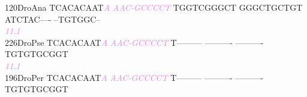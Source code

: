 \documentclass[11pt,twoside,reqno,a4paper]{article}
\begin{document}
{120\hspace*{1\charwidth}DroAna	TCACACAAT\textit{\textcolor{violet}{A}}	\textit{\textcolor{violet}{A}}\textit{\textcolor{violet}{A}}\textit{\textcolor{violet}{C}}\textit{\textcolor{violet}{-}}\textit{\textcolor{violet}{G}}\textit{\textcolor{violet}{C}}\textit{\textcolor{violet}{C}}\textit{\textcolor{violet}{C}}\textit{\textcolor{violet}{C}}\textit{\textcolor{violet}{T}}	TGGTCGGGCT	GGGCTGCTGT	ATCTAC----	--TGTGGC--	\\
\hspace*{4\charwidth}\hspace*{7\charwidth}\hspace*{9\charwidth}\textit{\textcolor{violet}{11.1}}\hspace*{1\charwidth}\hspace*{1\charwidth}\hspace*{1\charwidth}\hspace*{1\charwidth}\hspace*{1\charwidth}\hspace*{1\charwidth}\\
226\hspace*{1\charwidth}DroPse	TCACACAAT\textit{\textcolor{violet}{A}}	\textit{\textcolor{violet}{A}}\textit{\textcolor{violet}{A}}\textit{\textcolor{violet}{C}}\textit{\textcolor{violet}{-}}\textit{\textcolor{violet}{G}}\textit{\textcolor{violet}{C}}\textit{\textcolor{violet}{C}}\textit{\textcolor{violet}{C}}\textit{\textcolor{violet}{C}}\textit{\textcolor{violet}{T}}	T---------	----------	----------	TGTGTGCGGT	\\
\hspace*{4\charwidth}\hspace*{7\charwidth}\hspace*{9\charwidth}\textit{\textcolor{violet}{11.1}}\hspace*{1\charwidth}\hspace*{1\charwidth}\hspace*{1\charwidth}\hspace*{1\charwidth}\hspace*{1\charwidth}\hspace*{1\charwidth}\\
196\hspace*{1\charwidth}DroPer	TCACACAAT\textit{\textcolor{violet}{A}}	\textit{\textcolor{violet}{A}}\textit{\textcolor{violet}{A}}\textit{\textcolor{violet}{C}}\textit{\textcolor{violet}{-}}\textit{\textcolor{violet}{G}}\textit{\textcolor{violet}{C}}\textit{\textcolor{violet}{C}}\textit{\textcolor{violet}{C}}\textit{\textcolor{violet}{C}}\textit{\textcolor{violet}{T}}	T---------	----------	----------	TGTGTGCGGT	\\
}
\end{document}
